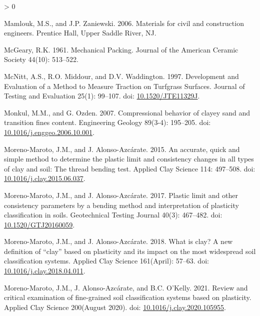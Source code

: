 \documentclass[
  letterpaper,
  openany]{book}
\newlength{\cslhangindent}
\newenvironment{CSLReferences}[2] %
 {%
  \setlength{\parindent}{0pt}
  \ifodd #1 \everypar{\setlength{\hangindent}{\cslhangindent}}\ignorespaces\fi
  \ifnum #2 > 0
  \setlength{\parskip}{#2\baselineskip}
  \fi
 }%
 {}
\begin{document}
\begin{CSLReferences}{1}{0}
\leavevmode\hypertarget{ref-Mamlouk2006}{}%
Mamlouk, M.S., and J.P. Zaniewski. 2006. {Materials for civil and construction engineers.} Prentice Hall, Upper Saddle River, NJ.

\leavevmode\hypertarget{ref-McGeary1961}{}%
McGeary, R.K. 1961. {Mechanical Packing}. Journal of the American Ceramic Society 44(10): 513--522.

\leavevmode\hypertarget{ref-McNitt1997a}{}%
McNitt, A.S., R.O. Middour, and D.V. Waddington. 1997. {Development and Evaluation of a Method to Measure Traction on Turfgrass Surfaces}. Journal of Testing and Evaluation 25(1): 99--107. doi: \href{https://doi.org/10.1520/JTE11329J}{10.1520/JTE11329J}.

\leavevmode\hypertarget{ref-Monkul2007}{}%
Monkul, M.M., and G. Ozden. 2007. {Compressional behavior of clayey sand and transition fines content}. Engineering Geology 89(3-4): 195--205. doi: \href{https://doi.org/10.1016/j.enggeo.2006.10.001}{10.1016/j.enggeo.2006.10.001}.

\leavevmode\hypertarget{ref-Moreno-Maroto2015a}{}%
Moreno-Maroto, J.M., and J. Alonso-Azcárate. 2015. {An accurate, quick and simple method to determine the plastic limit and consistency changes in all types of clay and soil: The thread bending test}. Applied Clay Science 114: 497--508. doi: \href{https://doi.org/10.1016/j.clay.2015.06.037}{10.1016/j.clay.2015.06.037}.

\leavevmode\hypertarget{ref-Moreno-Maroto2017}{}%
Moreno-Maroto, J.M., and J. Alonso-Azcárate. 2017. {Plastic limit and other consistency parameters by a bending method and interpretation of plasticity classification in soils}. Geotechnical Testing Journal 40(3): 467--482. doi: \href{https://doi.org/10.1520/GTJ20160059}{10.1520/GTJ20160059}.

\leavevmode\hypertarget{ref-Moreno-Maroto2018}{}%
Moreno-Maroto, J.M., and J. Alonso-Azcárate. 2018. {What is clay? A new definition of {``clay''} based on plasticity and its impact on the most widespread soil classification systems}. Applied Clay Science 161(April): 57--63. doi: \href{https://doi.org/10.1016/j.clay.2018.04.011}{10.1016/j.clay.2018.04.011}.

\leavevmode\hypertarget{ref-Moreno-Maroto2021}{}%
Moreno-Maroto, J.M., J. Alonso-Azcárate, and B.C. O'Kelly. 2021. {Review and critical examination of fine-grained soil classification systems based on plasticity}. Applied Clay Science 200(August 2020). doi: \href{https://doi.org/10.1016/j.clay.2020.105955}{10.1016/j.clay.2020.105955}.


\end{CSLReferences}
\end{document}
